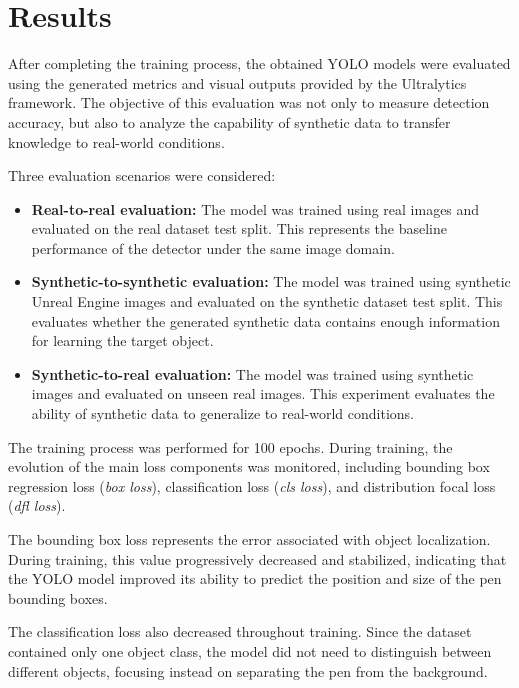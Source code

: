\documentclass[conference,a4paper]{IEEEtran}
\begin{document}
\section{Results}

After completing the training process, the obtained YOLO models were evaluated using the generated metrics and visual outputs provided by the Ultralytics framework. The objective of this evaluation was not only to measure detection accuracy, but also to analyze the capability of synthetic data to transfer knowledge to real-world conditions.

Three evaluation scenarios were considered:

\begin{itemize}
    \item \textbf{Real-to-real evaluation:} The model was trained using real images and evaluated on the real dataset test split. This represents the baseline performance of the detector under the same image domain.
    
    \item \textbf{Synthetic-to-synthetic evaluation:} The model was trained using synthetic Unreal Engine images and evaluated on the synthetic dataset test split. This evaluates whether the generated synthetic data contains enough information for learning the target object.
    
    \item \textbf{Synthetic-to-real evaluation:} The model was trained using synthetic images and evaluated on unseen real images. This experiment evaluates the ability of synthetic data to generalize to real-world conditions.
\end{itemize}


The training process was performed for 100 epochs. During training, the evolution of the main loss components was monitored, including bounding box regression loss (\textit{box loss}), classification loss (\textit{cls loss}), and distribution focal loss (\textit{dfl loss}).

The bounding box loss represents the error associated with object localization. During training, this value progressively decreased and stabilized, indicating that the YOLO model improved its ability to predict the position and size of the pen bounding boxes.

The classification loss also decreased throughout training. Since the dataset contained only one object class, the model did not need to distinguish between different objects, focusing instead on separating the pen from the background.
\end{document}
